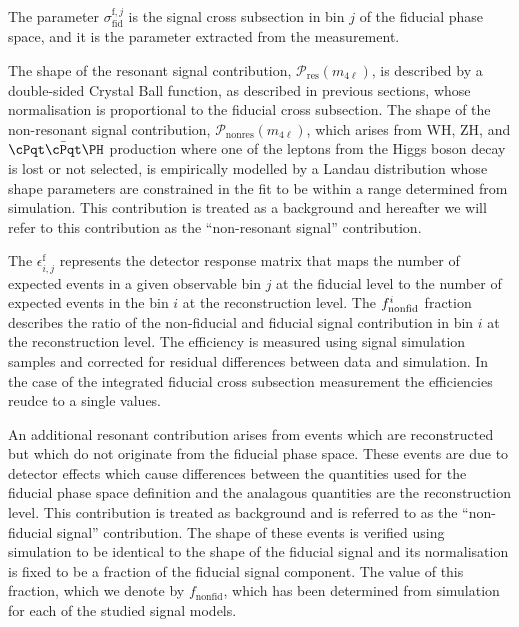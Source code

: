 The parameter $\sigma_{\mathrm{fid}}^{\mathrm{f},j}$ is the signal cross subsection in bin $j$ of the fiducial phase space, and it is the parameter extracted from the measurement. 

The shape of the resonant signal contribution, $\mathcal{P}_{\mathrm{res}}(m_{4\ell})$, is described by a double-sided Crystal Ball function, as described in previous sections, whose normalisation is proportional to the fiducial cross subsection. The shape of the non-resonant signal contribution, $\mathcal{P}_{\mathrm{nonres}}(m_{4\ell})$, which arises from WH, ZH, and $\ttH$ production where one of the leptons from the Higgs boson decay is lost or not selected, is empirically modelled by a Landau distribution whose shape parameters are constrained in the fit to be within a range determined from simulation. This contribution is treated as a background and hereafter we will refer to this contribution as the ``non-resonant signal'' contribution.

The $\epsilon_{i,j}^{\mathrm{f}}$ represents the detector response matrix that maps the number of expected events in a given observable bin $j$ at the fiducial level to the number of expected events in the bin $i$ at the reconstruction level. The $f_{\rm nonfid}^{i}$ fraction describes the ratio of the non-fiducial and fiducial signal contribution in bin $i$ at the reconstruction level.  The efficiency is measured using signal simulation samples and corrected for residual differences between data and simulation. In the case of the integrated fiducial cross subsection measurement the efficiencies reudce to a single values.

An  additional resonant contribution arises from events which are reconstructed but which do not originate from the fiducial phase space. These events are due to detector effects which cause differences between the quantities used for the fiducial phase space definition and the analagous quantities are the reconstruction level. This contribution is treated as background and is referred to as the ``non-fiducial signal'' contribution. The shape of these events is verified using simulation to be identical to the shape of the fiducial signal and its normalisation is fixed to be a fraction of the fiducial signal component. The value of this fraction, which we denote by $f_{\mathrm{nonfid}}$, which has been determined from simulation for each of the studied signal models. 

